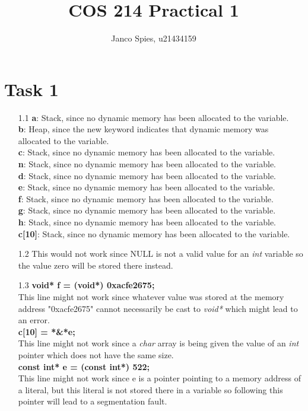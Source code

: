\documentclass{article}
\begin{document}
\title{COS 214 Practical 1}
\author{Janco Spies, u21434159}
\maketitle
\section*{Task 1}
\begin{itemize}
    \item[1.1]\textbf{a}: Stack, since no dynamic memory has been allocated to the variable.\\
               \textbf{b}: Heap, since the new keyword indicates that dynamic memory was allocated to the variable.\\
               \textbf{c}: Stack, since no dynamic memory has been allocated to the variable.\\
               \textbf{n}: Stack, since no dynamic memory has been allocated to the variable.\\
               \textbf{d}: Stack, since no dynamic memory has been allocated to the variable.\\
               \textbf{e}: Stack, since no dynamic memory has been allocated to the variable.\\
               \textbf{f}: Stack, since no dynamic memory has been allocated to the variable.\\
               \textbf{g}: Stack, since no dynamic memory has been allocated to the variable.\\
                \textbf{h}: Stack, since no dynamic memory has been allocated to the variable.\\
                \textbf{c[10]}: Stack, since no dynamic memory has been allocated to the variable.\\
    \item[1.2] This would not work since NULL is not a valid value for an \textit{int} variable so the value zero will be stored there instead.\\
    \item[1.3] \textbf{void* f = (void*) 0xacfe2675;}\\ This line might not work since whatever value was stored at the memory address "0xacfe2675" cannot necessarily be cast to \textit{void*} which might lead to an error.\\
                \textbf{c[10] = *\&*e;}\\ This line might not work since a \textit{char} array is being given the value of an \textit{int} pointer which does not have the same size.\\
                \textbf{const int* e = (const int*) 522;}\\ This line might not work since e is a pointer pointing to a memory address of a literal, but this literal is not stored there in a variable so following this pointer will lead to a segmentation fault.\\ 
\end{itemize}
\end{document}
